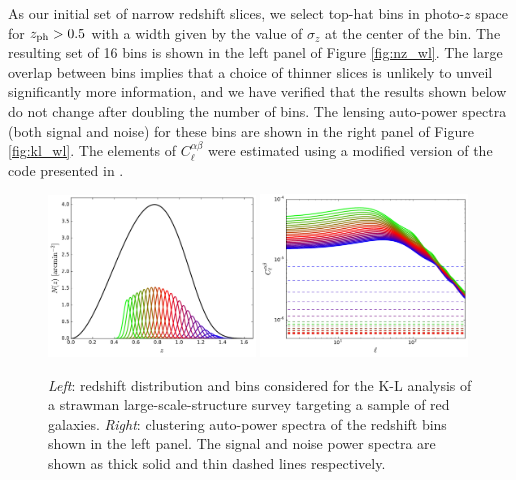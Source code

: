 \documentclass[twocolumn,amsfont,amssymb,amsmath, showpacs,balancelastpage, nofootinbib]{revtex4-1}
\begin{document}
    As our initial set of narrow redshift slices, we select top-hat bins in photo-$z$ space for $z_{\rm ph}>0.5$ with a width given by the value of $\sigma_z$ at the center of the bin. The resulting set of 16 bins is shown in the left panel of Figure \ref{fig:nz_wl}. The large overlap between bins implies that a choice of thinner slices is unlikely to unveil significantly more information, and we have verified that the results shown below do not change after doubling the number of bins. The lensing auto-power spectra (both signal and noise) for these bins are shown in the right panel of Figure \ref{fig:kl_wl}. The elements of $C^{\alpha\beta}_\ell$ were estimated using a modified version of the code presented in \cite{2013JCAP...11..044D}.
    \begin{figure}
      \centering
      \includegraphics[width=0.49\textwidth]{Figs/nz_lsst_gc}
      \includegraphics[width=0.49\textwidth]{Figs/c_ij_gc}
      \caption{{\sl Left}: redshift distribution and bins considered for the K-L analysis of a strawman large-scale-structure survey targeting a sample of red galaxies. {\sl Right}: clustering auto-power spectra of the redshift bins shown in the left panel. The signal and noise power spectra are shown as thick solid and thin dashed lines respectively.}\label{fig:nz_gc}
    \end{figure}
    
\end{document}
